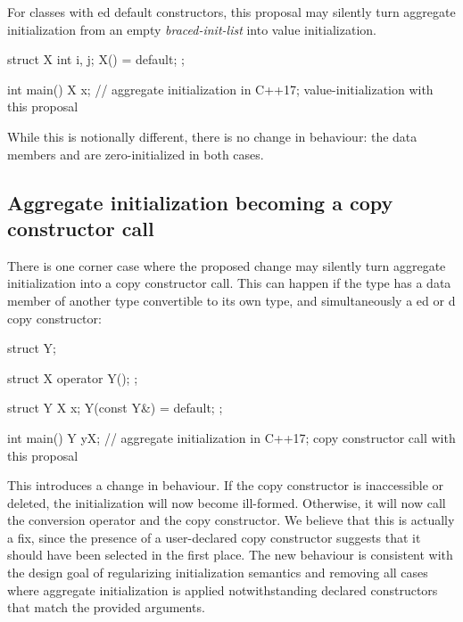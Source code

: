 For classes with ed default constructors, this proposal may silently turn aggregate initialization from an empty \emph{braced-init-list} into value initialization.

\begin{codeblock}
struct X {
  int i, j;
  X() = default;
};

int main() {
  X x{};  // aggregate initialization in C++17; value-initialization with this proposal
}
\end{codeblock}

While this is notionally different, there is no change in behaviour: the data members  and  are zero-initialized in both cases.


\subsection{Aggregate initialization becoming a copy constructor call}

There is one corner case where the proposed change may silently turn aggregate initialization into a copy constructor call. This can happen if the type has a data member of another type convertible to its own type, and simultaneously a ed or d copy constructor:

\begin{codeblock}
struct Y;

struct X {
  operator Y();
};

struct Y {
  X x;
  Y(const Y&) = default;
};

int main() {
    Y y{X{}};  // aggregate initialization in C++17; copy constructor call with this proposal
}
\end{codeblock}

This introduces a change in behaviour. If the copy constructor is inaccessible or deleted, the initialization will now become ill-formed. Otherwise, it will now call the conversion operator and the copy constructor. We believe that this is actually a fix, since the presence of a user-declared copy constructor suggests that it should have been selected in the first place. The new behaviour is consistent with the design goal of regularizing initialization semantics and removing all cases where aggregate initialization is applied notwithstanding declared constructors that match the provided arguments.


